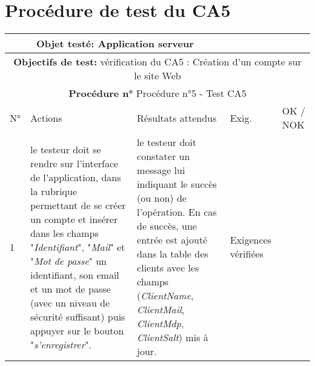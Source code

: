 \section{Procédure de test du CA5}
\begin{table}[!h]
        \centering
        \begin{tabular}{|m{0.6cm}|
                         >{\raggedright\arraybackslash}m{4cm}|
                         >{\raggedright\arraybackslash}m{6.4cm}|
                         >{\raggedright\arraybackslash}m{2cm}|
                         m{1cm}|}
            \hline
            \multicolumn{3}{|c|}{
                \textbf{Objet testé: } Application serveur
            } & \multicolumn{2}{|c|}{
                \textbf{Version: } version    
            } \\
            \hline
            \multicolumn{5}{|c|}{\textbf{Objectifs de test:}
                vérification du CA5 : Création d'un compte sur le site Web} \\
            \hline
            \multicolumn{5}{|c|}{
                \textbf{Procédure n° }Procédure n°5 - Test CA5
            } \\
            \hline
            N° & Actions & Résultats attendus & Exig. & OK / NOK \\
            \hline      %
            1 & le testeur doit se rendre sur l'interface de l'application,
                dans la rubrique permettant de se créer un compte et insérer
                dans les champs "\emph{Identifiant}", "\emph{Mail}" et 
                "\emph{Mot de passe}" un identifiant, son email et un mot de 
                passe (avec un niveau de sécurité suffisant) puis appuyer sur
                le bouton "\emph{s'enregistrer}".
              & le testeur doit constater un message lui indiquant le succès (ou non)
                de l'opération. En cas de succès, une entrée est ajouté dans la table 
                des clients avec les champs (\emph{ClientName}, \emph{ClientMail}, 
                \emph{ClientMdp}, \emph{ClientSalt}) mis à jour. 
              & Exigences vérifiées & \\
            \hline
        \end{tabular} 
        \label{tab:tab5}
\end{table}
\newpage

